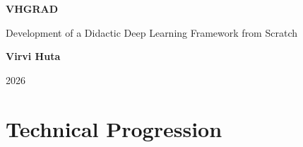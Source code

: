 \documentclass[12pt,a4paper]{report}
\begin{document}
\begin{titlepage}
    \centering

    \vspace*{3cm}

    {\Huge\bfseries VHGRAD \par}

    \vspace{0.8cm}

    {\Large Development of a Didactic Deep Learning Framework from Scratch \par}

    \vspace{3cm}

    {\large \textbf{Virvi Huta} \par}

    \vfill

    {\large 2026 \par}
\end{titlepage}

\clearpage

\tableofcontents
\clearpage

\chapter*{Technical Progression}

\begingroup
\small
\end{document}
